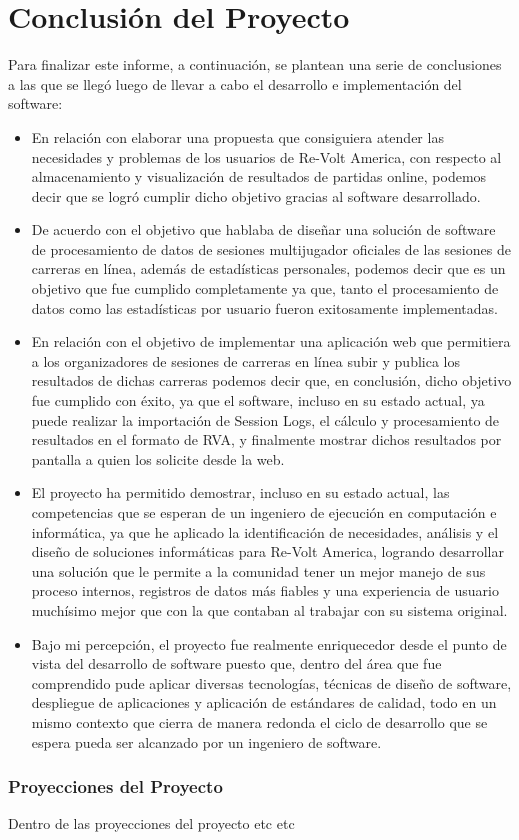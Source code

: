 \chapter{Conclusión del Proyecto}
Para finalizar este informe, a continuación, se plantean una serie de conclusiones a las que se llegó luego de llevar a cabo el desarrollo e implementación del software:

\begin{itemize}
	\item En relación con elaborar una propuesta que consiguiera atender las necesidades y problemas de los usuarios de Re-Volt America, con respecto al almacenamiento y visualización de resultados de partidas online, podemos decir que se logró cumplir dicho objetivo gracias al software desarrollado.
	\item De acuerdo con el objetivo que hablaba de diseñar una solución de software de procesamiento de datos de sesiones multijugador oficiales de las sesiones de carreras en línea, además de estadísticas personales, podemos decir que es un objetivo que fue cumplido completamente ya que, tanto el procesamiento de datos como las estadísticas por usuario fueron exitosamente implementadas.
	\item En relación con el objetivo de implementar una aplicación web que permitiera a los organizadores de sesiones de carreras en línea subir y publica los resultados de dichas carreras podemos decir que, en conclusión, dicho objetivo fue cumplido con éxito, ya que el software, incluso en su estado actual, ya puede realizar la importación de Session Logs, el cálculo y procesamiento de resultados en el formato de RVA, y finalmente mostrar dichos resultados por pantalla a quien los solicite desde la web.
	\item El proyecto ha permitido demostrar, incluso en su estado actual, las competencias que se esperan de un ingeniero de ejecución en computación e informática, ya que he aplicado la identificación de necesidades, análisis y el diseño de soluciones informáticas para Re-Volt America, logrando desarrollar una solución que le permite a la comunidad tener un mejor manejo de sus proceso internos, registros de datos más fiables y una experiencia de usuario muchísimo mejor que con la que contaban al trabajar con su sistema original. 
	\item Bajo mi percepción, el proyecto fue realmente enriquecedor desde el punto de vista del desarrollo de software puesto que, dentro del área que fue comprendido pude aplicar diversas tecnologías, técnicas de diseño de software, despliegue de aplicaciones y aplicación de estándares de calidad, todo en un mismo contexto que cierra de manera redonda el ciclo de desarrollo que se espera pueda ser alcanzado por un ingeniero de software.
\end{itemize}

\subsection{Proyecciones del Proyecto}
Dentro de las proyecciones del proyecto etc etc

